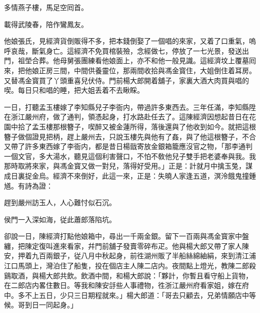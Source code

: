 \begin{myquote}
多情燕子樓，馬足空囘首。

載得武陵春，陪作鸞鳳友。
\end{myquote}

他娘張氏，見經濟貨倒販得不多，把本錢倒娶了一個唱的來家，又着了口重氣，嗚呼哀哉，斷氣身亡。這經濟不免買棺裝殮，念經做七，停放了一七光景，發送出門，祖塋合葬。他母舅張團練看他娘面上，亦不和他一般見識。這經濟坟上覆墓囘來，把他娘正房三間，中間供養靈位，那兩間收拾與馮金寳住，大姐倒住着耳房。又替馮金寳買了丫頭重喜兒伏侍。門前楊大郎開着舖子，家裏大酒大肉買與唱的喫。每日只和唱的睡，把大姐丢着不去瞅睬。

一日，打聽孟玉樓嫁了李知縣兒子李衙内，帶過許多東西去。三年任滿，李知縣陞在浙江嚴州府，做了通判，領憑起身，打水路赴任去了。這陳經濟因想起昔日在花園中拾了孟玉樓那根簪子，喫醉又被金蓮所得，落後還與了他收到如今。就把這根簪子做個證見把柄，趕上嚴州去，只說玉樓先與他有了姦，與了他這根簪子，不合又帶了許多東西嫁了李衙内，都是昔日楊戩寄放金銀箱籠應沒官之物，「那李通判一個文官，多大湯水，聽見這個利害聲口，不怕不敎他兒子雙手把老婆奉與我。我那時取將來家，與馮金寳又做一對兒，落得好受用。」正是：計就月中擒玉兔，謀成日裏捉金烏。經濟不來倒好，此這一來，正是：失曉人家逢五道，溟泠餓鬼撞鍾馗。有詩為證：

\begin{myquote}
趕到嚴州訪玉人，人心難忖似石沉。

侯門一入深如海，従此蕭郎落陷坑。
\end{myquote}

卻說一日，陳經濟打點他娘箱中，尋出一千兩金銀。留下一百兩與馮金寳家中盤纏，把陳定復叫進來看家，幷門前舖子發賣零碎布疋。他與楊大郎又帶了家人陳安，押着九百兩銀子，従八月中秋起身，前徃湖州販了半船絲綿紬絹，來到清江浦江口馬頭上，灣泊住了船隻，投在個店主人陳二店内。夜間點上燈光，教陳二郎殺鷄取酒，與楊大郎共飲。飲酒中間，和楊大郎說：「夥計，你暫且看守船上貨物，在二郎店内畧住數日。等我和陳安㧱些人事禮物，徃浙江嚴州府看家姐，嫁在府中。多不上五日，少只三日期程就來。」楊大郎道：「哥去只顧去，兄弟情願店中等候。哥到日一同起身。」

